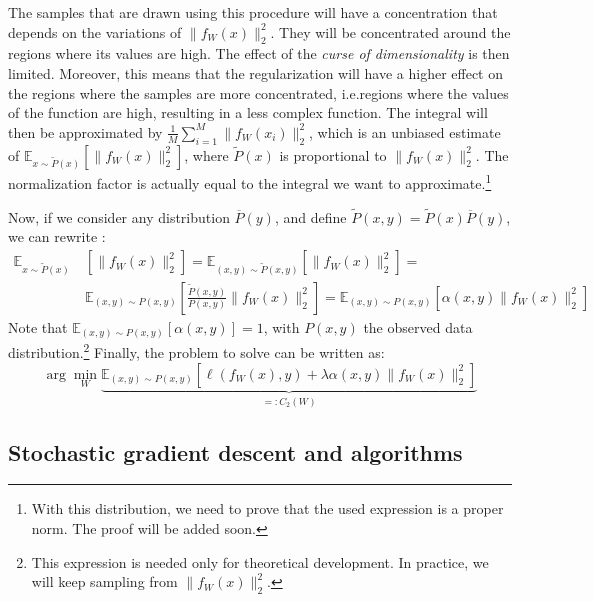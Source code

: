 \documentclass{article}
\begin{document}
The samples that are drawn using this procedure will have a concentration that depends on the variations of $\| f_W(x)\|_2^2$. They will be concentrated around the regions where its values are high. The effect of the \textit{curse of dimensionality} is then limited. Moreover, this means that the regularization will have a higher effect on the regions where the samples are more concentrated, i.e.\the regions where the values of the function are high, resulting in a less complex function. The integral will then be approximated by
$\frac{1}{M}\sum_{i=1}^M \| f_W(x_i)\|_2^2$,
which is an unbiased estimate of
$\mathbb{E}_{x\sim \tilde{P}(x)}[\| f_W(x)\|_2^2]$,
where $\tilde{P}(x)$ is proportional to $\| f_W(x)\|_2^2$. The normalization factor is actually equal to the integral we want to approximate.\footnote{With this distribution, we need to prove that the used expression is a proper norm. The proof will be added soon.}


Now, if we consider any distribution $\overline{P}(y)$, and  define $\tilde{P}(x,y) = \tilde{P}(x)\overline{P}(y)$, we can rewrite :
\begin{align}
\mathbb{E}_{x\sim \tilde{P}(x)} \ & [\| f_W(x)\|_2^2] = %
\mathbb{E}_{(x,y)\sim \tilde{P}(x,y)} [\| f_W(x)\|_2^2] = \nonumber\\&
\mathbb{E}_{(x,y)\sim P(x,y)}  \left[\frac{\tilde{P}(x,y)}{P(x,y)}\| f_W(x)\|_2^2\right] =
\mathbb{E}_{(x,y)\sim P(x,y)}  [\alpha(x,y)\| f_W(x)\|_2^2]
\label{eqSlice}
\end{align}
Note that $\mathbb{E}_{(x,y)\sim P(x,y)}[\alpha(x,y)] = 1$, with $P(x,y)$ the observed data distribution.\footnote{This expression is needed only for theoretical development. In practice, we will keep sampling from $\| f_W(x)\|_2^2$.}
Finally, the problem to solve can be written as:
\begin{equation}
\arg\min_W \underbrace{\mathbb{E}_{(x,y)\sim P(x,y)} [\ell(f_W(x),y) + \lambda\alpha(x,y)\| f_W(x)\|_2^2]}_{=: C_2(W)} %
\end{equation}

\subsection{Stochastic gradient descent and algorithms}
\end{document}
